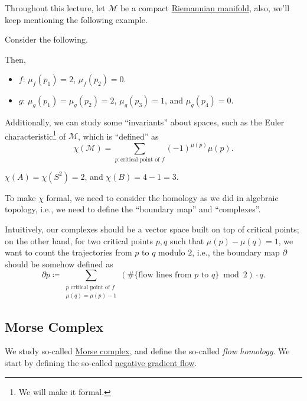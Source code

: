 Throughout this lecture, let \(\mathcal{M} \) be a compact \hyperref[def:Riemannian-manifold]{Riemannian manifold}, also, we'll keep mentioning the following example.

\begin{eg}
	Consider the following.
	\begin{center}
	\end{center}
	Then,
	\begin{itemize}
		\item \(f\): \(\mu _f(p_1) = 2\), \(\mu _f(p_2) = 0\).
		\item \(g\): \(\mu _g(p_1) = \mu _g(p_2) = 2\), \(\mu _g(p_3) = 1\), and \(\mu _g(p_4)= 0\).
	\end{itemize}
\end{eg}

Additionally, we can study some ``invariants'' about spaces, such as the Euler characteristic\footnote{We will make it formal.} of \(\mathcal{M} \), which is ``defined'' as
\[
	\chi (\mathcal{M} ) = \sum_{p \colon \text{critical point of } f} (-1)^{\mu (p)} \mu (p).
\]

\begin{eg}
	\(\chi (A) = \chi (S^2) = 2\), and \(\chi (B) = 4 - 1 = 3\).
\end{eg}

To make \(\chi \) formal, we need to consider the homology as we did in algebraic topology, i.e., we need to define the ``boundary map'' and ``complexes''.

\begin{intuition}
	Intuitively, our complexes should be a vector space built on top of critical points; on the other hand, for two critical points \(p, q\) such that \(\mu (p) - \mu (q) = 1\), we want to count the trajectories from \(p\) to \(q\) modulo \(2\), i.e., the boundary map \(\partial \) should be somehow defined as
	\[
		\partial p \coloneqq \sum_{\substack{\text{\(p\) critical point of \(f\)}\\ \mu (q) = \mu (p) - 1}} (\# \{\text{flow lines from \(p\) to \(q\)}\} \bmod 2) \cdot q.
	\]
\end{intuition}

\subsection{Morse Complex}
We study so-called \hyperref[def:Morse-complex]{Morse complex}, and define the so-called \emph{flow homology}. We start by defining the so-called \hyperref[def:negative-gradient-flow]{negative gradient flow}.

